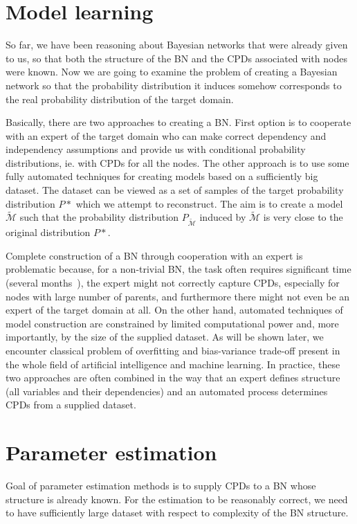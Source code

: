 \documentclass[english,cover]{fitthesis} %
\begin{document}
\section{Model learning}
So far, we have been reasoning about Bayesian networks that were already given to us, so that both the structure of the BN and the CPDs associated with nodes were known. Now we are going to examine the problem of creating a Bayesian network so that the probability distribution it induces somehow corresponds to the real probability distribution of the target domain.

Basically, there are two approaches to creating a BN. First option is to cooperate with an expert of the target domain who can make correct dependency and independency assumptions and provide us with conditional probability distributions, ie. with CPDs for all the nodes. The other approach is to use some fully automated techniques for creating models based on a sufficiently big dataset. The dataset can be viewed as a set of samples of the target probability distribution $P*$ which we attempt to reconstruct. The aim is to create a model $\tilde{\mathcal{M}}$ such that the probability distribution $P_{\tilde{\mathcal{M}}}$ induced by $\tilde{\mathcal{M}}$ is very close to the original distribution $P*$.

Complete construction of a BN through cooperation with an expert is problematic because, for a non-trivial BN, the task often requires significant time (several months~\cite{pgm}), the expert might not correctly capture CPDs, especially for nodes with large number of parents, and furthermore there might not even be an expert of the target domain at all. On the other hand, automated techniques of model construction are constrained by limited computational power and, more importantly, by the size of the supplied dataset. As will be shown later, we encounter classical problem of overfitting and bias-variance trade-off present in the whole field of artificial intelligence and machine learning. In practice, these two approaches are often combined in the way that an expert defines structure (all variables and their dependencies) and an automated process determines CPDs from a supplied dataset.



\section{Parameter estimation}
Goal of parameter estimation methods is to supply CPDs to a BN whose structure is already known. For the estimation to be reasonably correct, we need to have sufficiently large dataset with respect to complexity of the BN structure.
\end{document}
